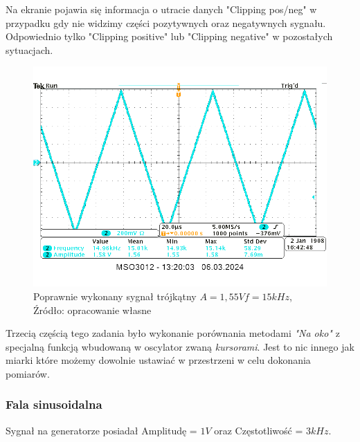 \documentclass{article}
\begin{document}
      Na ekranie pojawia się informacja o utracie danych "{}Clipping pos/neg" w przypadku gdy nie widzimy części pozytywnych oraz negatywnych sygnału. Odpowiednio tylko "{}Clipping positive"{} lub "{}Clipping negative"{} w pozostałych sytuacjach.


      \begin{figure}[!ht]
        \begin{center}
            \includegraphics[scale=0.4]{grafiki/Ramp_freq_15khz_amp_1.55.png}
            \caption{Poprawnie wykonany sygnał trójkątny $A = 1,55 V f = 15 kHz$,\\Źródło: opracowanie własne}
        \end{center}
      \end{figure}

      Trzecią częścią tego zadania było wykonanie porównania metodami \textit{"{}Na oko"{}} z specjalną funkcją wbudowaną w oscylator zwaną \textit{kursorami}. Jest to nic innego jak miarki które możemy dowolnie ustawiać w przestrzeni w celu dokonania pomiarów. 

      \subsubsection{Fala sinusoidalna}
        Sygnał na generatorze posiadał Amplitudę = $1V$ oraz Częstotliwość = $3 kHz$.
\end{document}

